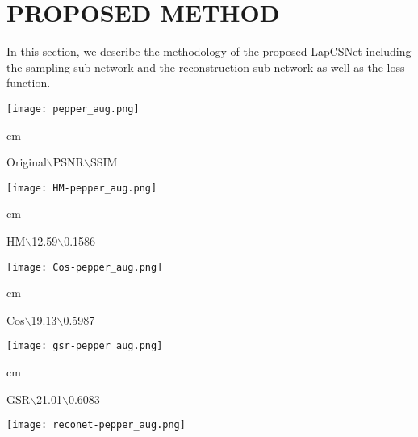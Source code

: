 \documentclass{article}
\begin{document}
\section{PROPOSED METHOD}
\label{sec:format}

In this section, we describe the methodology of the proposed LapCSNet including the sampling sub-network and the reconstruction sub-network as well as the loss function.


\begin{figure*}[tb]
\begin{minipage}[t]{0.12\textwidth}
\centering
\texttt{[image: pepper\_aug.png]}
\begin{scriptsize}
\centering
{} cm \begin{tiny}Original$\backslash$PSNR$\backslash$SSIM\end{tiny}
\end{scriptsize}
\end{minipage}
\hfill
\begin{minipage}[t]{0.12\textwidth}
\centering
\texttt{[image: HM-pepper\_aug.png]}
\begin{scriptsize}
\centering
{} cm \begin{tiny}HM$\backslash$12.59$\backslash$0.1586\end{tiny}
\end{scriptsize}
\end{minipage}
\hfill
\begin{minipage}[t]{0.12\textwidth}
\centering
\texttt{[image: Cos-pepper\_aug.png]}
\begin{scriptsize}
\centering
{} cm \begin{tiny}Cos$\backslash$19.13$\backslash$0.5987\end{tiny}
\end{scriptsize}
\end{minipage}
\hfill
\begin{minipage}[t]{0.12\textwidth}
\centering
\texttt{[image: gsr-pepper\_aug.png]}
\begin{scriptsize}
\centering
{} cm \begin{tiny}GSR$\backslash$21.01$\backslash$0.6083\end{tiny}
\end{scriptsize}
\end{minipage}
\hfill
\begin{minipage}[t]{0.12\textwidth}
\centering
\texttt{[image: reconet-pepper\_aug.png]}
\begin{scriptsize}

\end{scriptsize}
\end{minipage}
\end{figure*}
\end{document}
